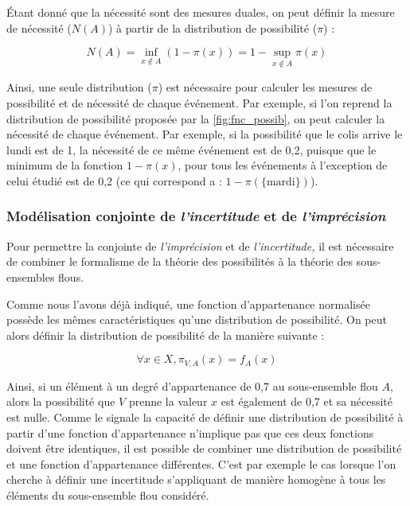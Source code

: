 Étant donné que la nécessité sont des mesures duales, on peut définir
la mesure de nécessité (\(N(A)\)) à partir de la distribution de
possibilité (\(π\)) :

\begin{equation}
  N(A) = \inf_{x ∉ A}(1-π(x)) = 1 - \sup_{x ∉ A}π(x)
\end{equation}

Ainsi, une seule distribution (\(\pi\)) est nécessaire pour calculer
les mesures de possibilité et de nécessité de chaque événement. Par
exemple, si l'on reprend la distribution de possibilité proposée par
la \autoref{fig:fnc_possib}, on peut calculer la nécessité de chaque
événement. Par exemple, si la possibilité que le colis arrive le lundi
est de 1, la nécessité de ce même événement est de 0,2, puisque que le
minimum de la fonction \(1-π(x)\), pour tous les événements à
l'exception de celui étudié est de 0,2 (ce qui correspond a :
\(1-π(\{\text{mardi}\})\)).

\subsubsection{Modélisation conjointe de \emph{l'incertitude} et de
  \emph{l'imprécision}}

Pour permettre la conjointe de \emph{l'imprécision} et de
\emph{l'incertitude,} il est nécessaire de combiner le formalisme de
la théorie des possibilités à la théorie des sous-ensembles flous.

Comme nous l'avons déjà indiqué, une fonction d'appartenance
normalisée possède les mêmes caractéristiques qu'une distribution de
possibilité.
%
On peut alors définir la distribution de possibilité de la manière
suivante :

\begin{equation}
  \forall x \in X, \pi_{V, A}(x)=f_A(x)
\end{equation}

Ainsi, si un élément à un degré d'appartenance de 0,7 au sous-ensemble
flou \(A\), alors la possibilité que \(V\) prenne la valeur \(x\) est
également de 0,7 et sa nécessité est nulle.
%
Comme le signale \textcite{Bouchon-Meunier1995} la capacité de définir
une distribution de possibilité à partir d'une fonction d'appartenance
n'implique pas que ces deux fonctions doivent être identiques, il est
possible de combiner une distribution de possibilité et une fonction
d'appartenance différentes.
%
C'est par exemple le cas lorsque l'on cherche à définir une
incertitude s'appliquant de manière homogène à tous les éléments du
sous-ensemble flou considéré.

